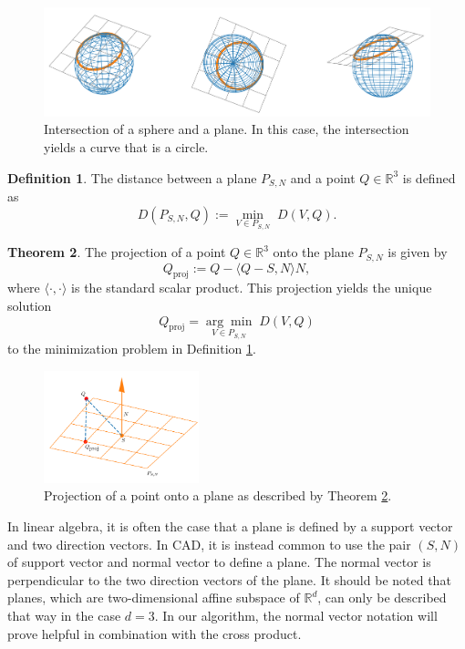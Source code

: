 \documentclass[a4paper, 11pt]{report}
\theoremstyle{definition}
\newtheorem{definition}{Definition}[section]
\newtheorem{theorem}[definition]{Theorem}
\begin{document}
	\begin{figure}[H]
		\centering
		\includegraphics[width=\textwidth]{../python/surfacePlaneIntersection1_cropped.png}
		\caption{Intersection of a sphere and a plane. In this case, the intersection yields a curve that is a circle.}
		\label{fig:planeintersectionexample}
	\end{figure}

	\begin{definition}\label{def:distanceplane}
		The distance between a plane $P_{S,N}$ and a point $Q \in \mathbb{R}^3$ is defined as
			$$ D(P_{S,N}, Q) := \underset{V \in P_{S,N}}{\min} \; D(V, Q). $$
	\end{definition}

	\begin{theorem}\label{thm:planeprojection}
		The projection of a point $Q \in \mathbb{R}^3$ onto the plane $P_{S,N}$ is given by
			$$Q_\textrm{proj} := Q - \langle Q - S, N \rangle N,$$
		where $\langle \cdot,\cdot \rangle$ is the standard scalar product. This projection yields the unique solution
			$$ Q_\textrm{proj} = \underset{V \in P_{S,N}}{\arg\min} \; D(V, Q) $$
		to the minimization problem in Definition \ref{def:distanceplane}.
	\end{theorem}

	\begin{figure}[H]
		\centering
		\includegraphics[width=0.4\textwidth]{../python/surfacePlaneIntersection3_cropped.png}
		\caption{Projection of a point onto a plane as described by Theorem \ref{thm:planeprojection}.}
	\end{figure}

	In linear algebra, it is often the case that a plane is defined by a support vector and two direction vectors. In CAD, it is instead common to use the pair $(S,N)$ of support vector and normal vector to define a plane. The normal vector is perpendicular to the two direction vectors of the plane. It should be noted that planes, which are two-dimensional affine subspace of $\mathbb{R}^d$, can only be described that way in the case $d = 3$. In our algorithm, the normal vector notation will prove helpful in combination with the cross product.
\end{document}
